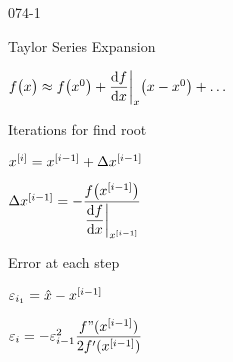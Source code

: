 \begin{mitframe}{074-1}
\begin{listone}
\item Taylor Series Expansion
	\begin{listtwo}
    	\item $\fug\big(\disp\big)\approx\fug\big(\disp^{\init}\big)+\dfrac{\mathrm{d}\fug}{\mathrm{d}\disp}\bigg|_{\disp}\big(\disp-\disp^{\init}\big)+\ldots$
    \end{listtwo}
\item Iterations for find root
	\begin{listtwo}
    	\item $\disp^{[\state]}=\disp^{[\state-1]}+\iipf\disp^{[\state-1]}$
        \item $\iipf\disp^{[\state-1]}=-\dfrac{\fug\big(\disp^{[\state-1]}\big)}{\dfrac{\mathrm{d}
        \fug}{\mathrm{d}\disp}\bigg|_{\disp^{[\state-1]}}}$       
    \end{listtwo}
\item Error at each step
		\begin{listtwo}
        	\item $\varepsilon_{\state_1}=\hat{\disp}-\disp^{[\state-1]}$
            \item $\varepsilon_{\state}=-\varepsilon_{\state-1}^2\dfrac{\fug"(\disp^{[\state-1]})}{2\fug'(\disp^{[\state-1]})}$
        \end{listtwo}
\end{listone}    
\end{mitframe}